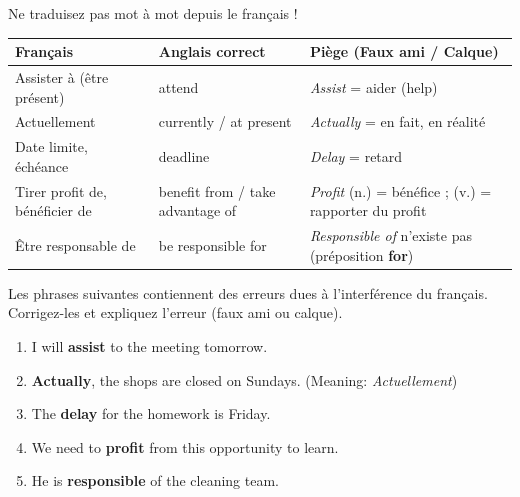 \documentclass[11pt]{article}
\newcommand{\cle}[1]{{\popxbold\color{popdark}#1}}
\begin{document}
\begin{attention}
Ne traduisez pas mot à mot depuis le français !
\begin{center}
\begin{tabularx}{\linewidth}{|X|X|X|}
\hline
\rowcolor{poporangeL} \textbf{Français} & \textbf{Anglais correct} & \textbf{Piège (Faux ami / Calque)} \\
\hline
Assister à (être présent) & \cle{attend} & \textit{Assist} = aider (help) \\
Actuellement & \cle{currently} / \cle{at present} & \textit{Actually} = en fait, en réalité \\
Date limite, échéance & \cle{deadline} & \textit{Delay} = retard \\
Tirer profit de, bénéficier de & \cle{benefit from} / \cle{take advantage of} & \textit{Profit} (n.) = bénéfice ; (v.) = rapporter du profit \\
Être responsable de & \cle{be responsible for} & \textit{Responsible of} n'existe pas (préposition \textbf{for}) \\
\hline
\end{tabularx}
\end{center}
\end{attention}

\begin{exercice}
Les phrases suivantes contiennent des erreurs dues à l'interférence du français. Corrigez-les et expliquez l'erreur (faux ami ou calque).
\begin{enumerate}
\item I will \textbf{assist} to the meeting tomorrow.
\item \textbf{Actually}, the shops are closed on Sundays. (Meaning: \textit{Actuellement})
\item The \textbf{delay} for the homework is Friday.
\item We need to \textbf{profit} from this opportunity to learn.
\item He is \textbf{responsible} of the cleaning team.
\end{enumerate}
\end{exercice}
\end{document}
